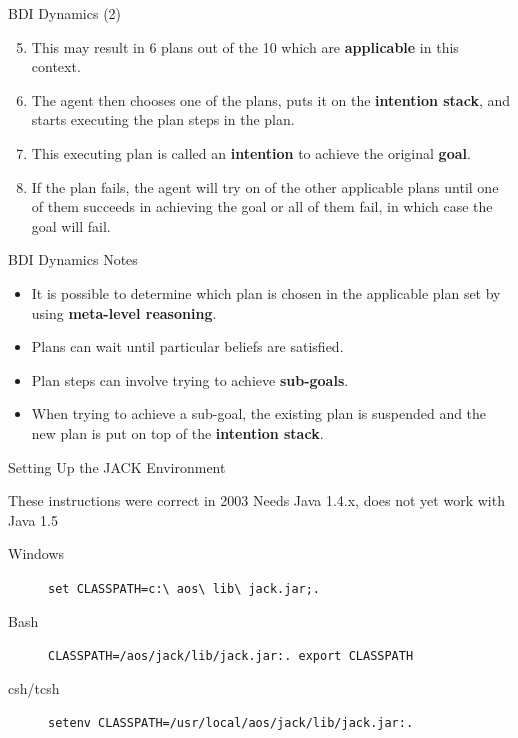 \documentclass[aspectratio=1610,xcolor=dvipsnames,t]{beamer}
\begin{document}
\begin{frame}{BDI Dynamics (2)}
    \begin{enumerate}
        \setcounter{enumi}{4}
        \item This may result in 6 plans out of the 10 which are
              \textbf{applicable} in this context. 
        \item The agent then chooses one of the plans, puts it on the
              \textbf{intention stack}, and starts executing the plan
              steps in the plan.
        \item This executing plan is called an \textbf{intention} to 
              achieve the original \textbf{goal}. 
        \item If the plan fails, the agent will try on of the other
              applicable plans until one of them succeeds in 
              achieving the goal or all of them fail, in which case
              the goal will fail.
    \end{enumerate} 
\end{frame} 

\begin{frame}{BDI Dynamics Notes}
    \begin{itemize} 
        \item It is possible to determine which plan is chosen in the
              applicable plan set by using \textbf{meta-level reasoning}.
        \item Plans can wait until particular beliefs are satisfied.
        \item Plan steps can involve trying to achieve \textbf{sub-goals}.
        \item When trying to achieve a sub-goal, the existing plan
              is suspended and the new plan is put on top of the
              \textbf{intention stack}. 
    \end{itemize} 
\end{frame} 

\begin{frame}{Setting Up the JACK Environment} 
    \begin{alertblock}{These instructions were correct in 2003} 
        Needs Java 1.4.x, does not yet work with Java 1.5
        \begin{description}
            \item[Windows] 
                \texttt{set
                CLASSPATH=c:\textbackslash~aos\textbackslash~lib\textbackslash~jack.jar;.}
            \item[Bash] 
                \texttt{CLASSPATH=/aos/jack/lib/jack.jar:. export CLASSPATH} 
            \item[csh/tcsh]
                \texttt{setenv CLASSPATH=/usr/local/aos/jack/lib/jack.jar:. } 
        \end{description}
    \end{alertblock}
\end{frame} 
\end{document}
